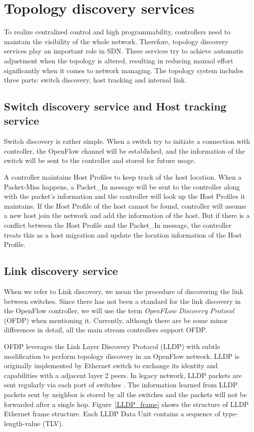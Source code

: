 \section{Topology discovery services}
\label{Topology discovery services}
To realize centralized control and high programmability, controllers need to maintain the visibility of the whole network. Therefore, topology discovery services play an important role in SDN. These services try to achieve automatic adjustment when the topology is altered, resulting in reducing manual effort significantly when it comes to network managing. The topology system includes three parts: switch discovery, host tracking and internal link.

\subsection{Switch discovery service and Host tracking service}
Switch discovery is rather simple. When a switch try to initiate a connection with controller, the OpenFlow channel will be established, and the information of the switch will be sent to the controller and stored for future usage. 

A controller maintains Host Profiles to keep track of the host location. When a Packet-Miss happens, a Packet\_In message will be sent to the controller along with the packet's information and the controller will look up the Host Profiles it maintains. If the Host Profile of the host cannot be found, controller will assume a new host join the network and add the information of the host. But if there is a conflict between the Host Profile and the Packet\_In message, the controller treats this as a host migration and update the location information of the Host Profile.

\subsection{Link discovery service}
\label{Link discovery service}
When we refer to Link discovery, we mean the procedure of discovering the link between switches. Since there has not been a standard for the link discovery in the OpenFlow controller, we will use the term \textit{OpenFLow Discovery Protocol} (OFDP) when mentioning it. Currently, although there are be some minor differences in detail, all the main stream controllers support OFDP.

OFDP leverages the Link Layer Discovery Protocol (LLDP) with subtle modification to perform topology discovery in an OpenFlow network. LLDP is originally implemented by Ethernet switch to exchange its identity and capabilities with a adjacent layer 2 peers. In legacy network, LLDP packets are sent regularly via each port of switches \cite{LLDP_WS}. The information learned from LLDP packets sent by neighbor is stored by all the switches and the packets will not be forwarded after a single hop. Figure~\ref{LLDP_frame} shows the structure of LLDP Ethernet frame structure. Each LLDP Data Unit contains a sequence of type-length-value (TLV). 

